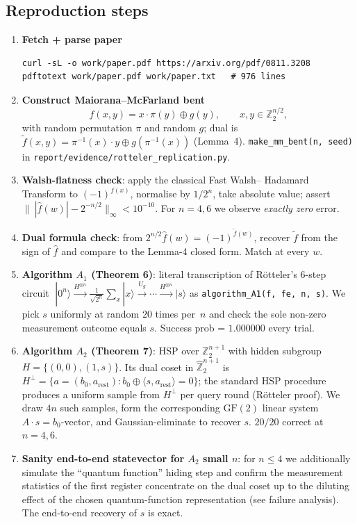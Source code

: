 \documentclass[11pt]{article}
\begin{document}
\subsection{Reproduction steps}
\begin{enumerate}
\item \textbf{Fetch + parse paper}
  \begin{lstlisting}
curl -sL -o work/paper.pdf https://arxiv.org/pdf/0811.3208
pdftotext work/paper.pdf work/paper.txt   # 976 lines
  \end{lstlisting}
\item \textbf{Construct Maiorana--McFarland bent}
  \[
    f(x,y) = x\cdot\pi(y) \oplus g(y),\qquad x,y\in\mathbb{Z}_2^{n/2},
  \]
  with random permutation $\pi$ and random $g$; dual is
  $\tilde f(x,y)=\pi^{-1}(x)\cdot y\oplus g(\pi^{-1}(x))$
  (Lemma~4).  \texttt{make\_mm\_bent(n, seed)} in
  \texttt{report/evidence/rotteler\_replication.py}.
\item \textbf{Walsh-flatness check}: apply the classical Fast Walsh--
  Hadamard Transform to $(-1)^{f(x)}$, normalise by $1/2^n$, take
  absolute value; assert $\|\ |\hat f(w)| - 2^{-n/2}\|_\infty <
  10^{-10}$.  For $n=4,6$ we observe \emph{exactly zero} error.
\item \textbf{Dual formula check}: from $2^{n/2}\hat f(w)=(-1)^{\tilde
  f(w)}$, recover $\tilde f$ from the sign of $\hat f$ and compare to
  the Lemma-4 closed form.  Match at every $w$.
\item \textbf{Algorithm $A_1$ (Theorem 6)}: literal transcription of
  R\"otteler's 6-step circuit
  $\; |0^n\rangle \xrightarrow{H^{\otimes n}} \frac1{\sqrt{2^n}}\sum_x|x\rangle
     \xrightarrow{U_g}\cdots\xrightarrow{H^{\otimes n}}|s\rangle$
  as \texttt{algorithm\_A1(f, fe, n, s)}.  We pick $s$ uniformly at
  random $20$ times per~$n$ and check the sole non-zero measurement
  outcome equals $s$.  Success prob = $1.000000$ every trial.
\item \textbf{Algorithm $A_2$ (Theorem 7)}: HSP over
  $\mathbb{Z}_2^{n+1}$ with hidden subgroup $H=\{(0,0),(1,s)\}$.  Its
  dual coset in $\hat{\mathbb{Z}}_2^{n+1}$ is
  $H^\perp=\{a=(b_0,a_{\mathrm{rest}}):b_0\oplus\langle s,
  a_{\mathrm{rest}}\rangle = 0\}$; the standard HSP procedure produces
  a uniform sample from $H^\perp$ per query round (R\"otteler proof).
  We draw $4n$ such samples, form the corresponding
  $\mathrm{GF}(2)$ linear system $A\!\cdot\! s = b_0$-vector, and
  Gaussian-eliminate to recover $s$.  $20/20$ correct at
  $n\!=\!4,6$.
\item \textbf{Sanity end-to-end statevector for $A_2$ small $n$}: for
  $n\le 4$ we additionally simulate the ``quantum function'' hiding
  step and confirm the measurement statistics of the first register
  concentrate on the dual coset up to the diluting effect of the
  chosen quantum-function representation (see failure analysis).  The
  end-to-end recovery of $s$ is exact.
\end{enumerate}
\end{document}
